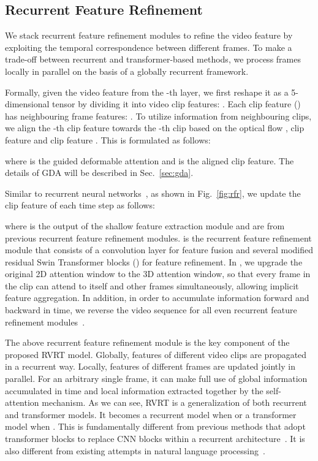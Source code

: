 \documentclass{article}
\newlength \g
\begin{document}
\subsection{Recurrent Feature Refinement}
\label{sec:rtfp}
We stack  recurrent feature refinement modules to refine the video feature by exploiting the temporal correspondence between different frames. To make a trade-off between recurrent and transformer-based methods, we process  frames locally in parallel on the basis of a globally recurrent framework.

Formally, given the video feature  from the -th layer, we first reshape it as a 5-dimensional tensor  by dividing it into  video clip features: . Each clip feature  () has  neighbouring frame features: . To utilize information from neighbouring clips, we align the -th clip feature  towards the -th clip based on the optical flow , clip feature  and clip feature . This is formulated as follows:

where  is the guided deformable attention and  is the aligned clip feature. The details of GDA will be described in Sec.~\ref{sec:gda}.

Similar to recurrent neural networks~\cite{sajjadi2018FRVSR, chan2021basicvsr, chan2021basicvsr++}, as shown in Fig.~\ref{fig:rfr}, we update the clip feature of each time step as follows:

where  is the output of the shallow feature extraction module and  are from previous recurrent feature refinement modules.  is the recurrent feature refinement module that consists of a convolution layer for feature fusion and several modified residual Swin Transformer blocks () for feature refinement. In , we upgrade the original 2D  attention window to the 3D  attention window, so that every frame in the clip can attend to itself and other frames simultaneously, allowing implicit feature aggregation. In addition, in order to accumulate information forward and backward in time, we reverse the video sequence for all even recurrent feature refinement modules~\cite{huang2015bidirectional, chan2021basicvsr++}.

The above recurrent feature refinement module is the key component of the proposed RVRT model. Globally, features of different video clips are propagated in a recurrent way. Locally, features of different frames are updated jointly in parallel. For an arbitrary single frame, it can make full use of global information accumulated in time and local information extracted together by the self-attention mechanism. As we can see, RVRT is a generalization of both recurrent and transformer models. It becomes a recurrent model when  or a transformer model when . This is fundamentally different from previous methods that adopt transformer blocks to replace CNN blocks within a recurrent architecture~\cite{wan2022bringing, lin2022flow}. It is also different from existing attempts in natural language processing~\cite{wang2019r, lei2020mart}.
\end{document}
